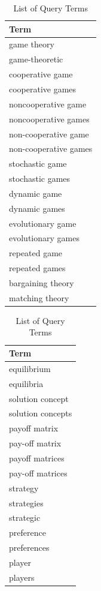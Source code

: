 \documentclass[
  12pt,
]{article}
\begin{document}
\begin{table}[H]
\caption{\label{tab:terms}List of Query Terms}

\centering
\fontsize{10}{12}\selectfont
\begin{tabular}[t]{l}
\toprule
Term\\
\midrule
game theory\\
game-theoretic\\
cooperative game\\
cooperative games\\
noncooperative game\\
noncooperative games\\
non-cooperative game\\
non-cooperative games\\
stochastic game\\
stochastic games\\
dynamic game\\
dynamic games\\
evolutionary game\\
evolutionary games\\
repeated game\\
repeated games\\
bargaining theory\\
matching theory\\
\bottomrule
\end{tabular}
\centering
\begin{tabular}[t]{l}
\toprule
Term\\
\midrule
equilibrium\\
equilibria\\
solution concept\\
solution concepts\\
payoff matrix\\
pay-off matrix\\
payoff matrices\\
pay-off matrices\\
strategy\\
strategies\\
strategic\\
preference\\
preferences\\
player\\
players\\
\bottomrule
\end{tabular}
\end{table}

\newpage
\end{document}
